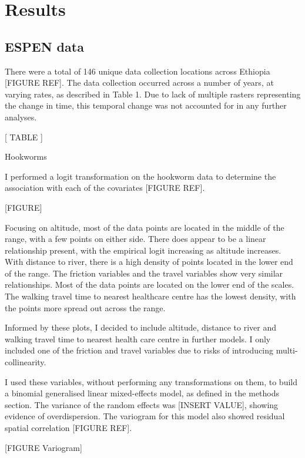 \documentclass[
]{article}
\begin{document}
\hypertarget{results}{%
\section{Results}\label{results}}

\hypertarget{espen-data}{%
\subsection{ESPEN data}\label{espen-data}}

There were a total of 146 unique data collection locations across
Ethiopia {[}FIGURE REF{]}. The data collection occurred across a number
of years, at varying rates, as described in Table 1. Due to lack of
multiple rasters representing the change in time, this temporal change
was not accounted for in any further analyses.

{[} TABLE {]}

Hookworms

I performed a logit transformation on the hookworm data to determine the
association with each of the covariates {[}FIGURE REF{]}.

{[}FIGURE{]}

Focusing on altitude, most of the data points are located in the middle
of the range, with a few points on either side. There does appear to be
a linear relationship present, with the empirical logit increasing as
altitude increases. With distance to river, there is a high density of
points located in the lower end of the range. The friction variables and
the travel variables show very similar relationships. Most of the data
points are located on the lower end of the scales. The walking travel
time to nearest healthcare centre has the lowest density, with the
points more spread out across the range.

Informed by these plots, I decided to include altitude, distance to
river and walking travel time to nearest health care centre in further
models. I only included one of the friction and travel variables due to
risks of introducing multi-collinearity.

I used these variables, without performing any transformations on them,
to build a binomial generalised linear mixed-effects model, as defined
in the methods section. The variance of the random effects was {[}INSERT
VALUE{]}, showing evidence of overdispersion. The variogram for this
model also showed residual spatial correlation {[}FIGURE REF{]}.

{[}FIGURE Variogram{]}
\end{document}
